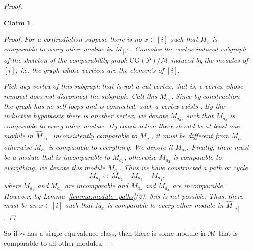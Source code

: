 \documentclass[9pt,a4paper,oneside]{article}
\newtheorem*{claim*}{Claim}
\newcommand{\cM}{\mathcal{M}}
\newcommand{\cP}{\mathcal{P}}
\newcommand{\CG}{\mathrm{CG}}
\begin{document}
\begin{proof}
\begin{claim*}
\begin{proof}
For a contradiction suppose there is no $x\in [i]$ such that $M_x$ is comparable to every other module in $\widehat{M}_{[i]}$. 
Consider the vertex induced subgraph of the skeleton of the comparability graph $\CG(\cP)/\cM$ induced by the modules of $[i]$, i.e. the graph whose vertices are the elements of $[i]$.

Pick any vertex of this subgraph that is not a cut vertex, that is, a vertex whose removal does not disconnect the subgraph. 
Call this $M_{a_1}$. Since by construction the graph has no self loops and is connected, such a vertex exists \cite[Proposition 1.2.29]{west2001introduction}.
By the inductive hypothesis there is another vertex, we denote $M_{a_3}$, such that $M_{a_3}$ is comparable to every other module.  By construction there should be at least one module in $\widehat{M}_{[i]}$ inconsistently comparable to $M_{a_1}$, it must be different from $M_{a_3}$ otherwise $M_{a_3}$ is comparable to everything.  We denote it $M_{a_2}$.  Finally, there must be a module that is incomparable to $M_{a_2}$, otherwise $M_{a_2}$ is comparable to everything, we denote this module $M_{a_4}$. 
Thus we have constructed a path or cycle
\[M_{a_1}\leftrightarrow M_{a_2}-M_{a_3} - M_{a_4}, \]
where $M_{a_1}$ and $M_{a_3}$ are incomparable and $M_{a_2}$ and $M_{a_4}$ are incomparable.
However, by Lemma~\ref{lemma:module_paths}(2), this is not possible.  Thus, there must be an $x\in[i]$ such that $M_x$ is comparable to every other module in $\widehat{M}_{[i]}$.
\end{proof}
\end{claim*}
So if $\sim$ has a single equivalence class, then there is some module in $\cM$ that is comparable to all other modules.
\end{proof}
\end{document}
